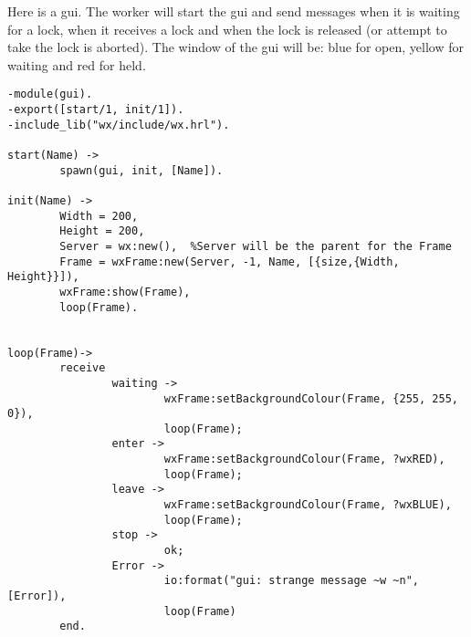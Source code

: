 \documentclass[a4paper, 11pt]{article}
\begin{document}
Here is a gui. The worker will start the gui and send messages when it
is waiting for a lock, when it receives a lock and when the lock is
released (or attempt to take the lock is aborted). The window of the
gui will be: blue for open, yellow for waiting and red for held.

\begin{verbatim}
-module(gui).
-export([start/1, init/1]).
-include_lib("wx/include/wx.hrl").

start(Name) ->
        spawn(gui, init, [Name]).

init(Name) ->
        Width = 200,
        Height = 200,
        Server = wx:new(),  %Server will be the parent for the Frame
        Frame = wxFrame:new(Server, -1, Name, [{size,{Width, Height}}]), 
        wxFrame:show(Frame),
        loop(Frame).
        

loop(Frame)->
        receive
                waiting ->
                        wxFrame:setBackgroundColour(Frame, {255, 255, 0}),
                        loop(Frame);
                enter ->
                        wxFrame:setBackgroundColour(Frame, ?wxRED),
                        loop(Frame);
                leave ->
                        wxFrame:setBackgroundColour(Frame, ?wxBLUE),
                        loop(Frame);
                stop ->
                        ok;
                Error ->
                        io:format("gui: strange message ~w ~n", [Error]),
                        loop(Frame)
        end.

\end{verbatim}
\end{document}
